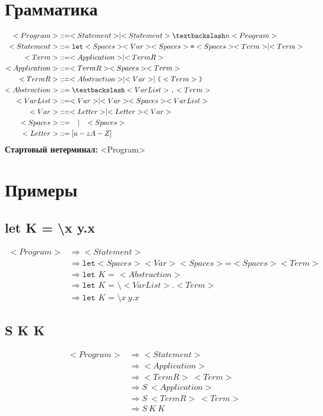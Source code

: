 \documentclass{article}
\begin{document}
\section{Грамматика}
\begin{align*}
<Program>       &::= <Statement> \mid <Statement>\textbackslash n<Program> \\
<Statement>     &::= \texttt{let} <Spaces> <Var> <Spaces> \texttt{=} <Spaces> <Term> \mid <Term> \\
<Term>          &::= <Application> \mid <TermR> \\
<Application>   &::= <TermR> <Spaces> <Term> \\
<TermR>         &::= <Abstraction> \mid <Var> \mid \texttt{(}<Term>\texttt{)} \\
<Abstraction>   &::= \texttt{\textbackslash} <VarList> \texttt{.} <Term> \\
<VarList>       &::= <Var> \mid <Var> <Spaces> <VarList> \\
<Var>           &::= <Letter> \mid <Letter><Var> \\
<Spaces>        &::= \texttt{ } \mid \texttt{ }<Spaces> \\
<Letter>        &::= [a-zA-Z]
\end{align*}
\textbf{Стартовый нетерминал:} <Program>

\section{Примеры}
\subsection{let K = \textbackslash x y.x}
\begin{align*}
<Program>       &\Rightarrow <Statement> \\
&\Rightarrow \texttt{let} <Spaces> <Var> <Spaces> \texttt{=} <Spaces> <Term> \\
&\Rightarrow \texttt{let } K \texttt{ = } <Abstraction> \\
&\Rightarrow \texttt{let } K \texttt{ = } \texttt{\textbackslash} <VarList> \texttt{.} <Term> \\
&\Rightarrow \texttt{let } K \texttt{ = } \texttt{\textbackslash} x\ y \texttt{.} x
\end{align*}

\subsection{S K K}
\begin{align*}
<Program>       &\Rightarrow <Statement> \\
&\Rightarrow <Application> \\
&\Rightarrow <TermR>\ <Term> \\
&\Rightarrow S\ <Application> \\
&\Rightarrow S\ <TermR>\ <Term> \\
&\Rightarrow S\ K\ K
\end{align*}
\end{document}
